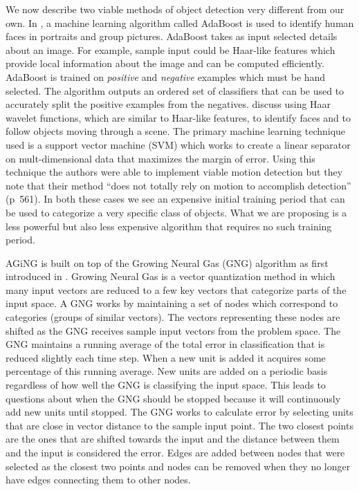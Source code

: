 \documentclass{article}
\renewcommand{\|}{\origbar} %
\begin{document}
We now describe two viable methods of object detection very different from our own. In , a machine learning algorithm called AdaBoost is used to identify human faces in portraits and group pictures. AdaBoost takes as input selected details about an image. For example, sample input could be Haar-like features which provide local information about the image and can be computed efficiently. AdaBoost is trained on {\em positive} and {\em negative} examples which must be hand selected. The algorithm outputs an ordered set of classifiers that can be used to accurately split the positive examples from the negatives.  discuss using Haar wavelet functions, which are similar to Haar-like features, to identify faces and to follow objects moving through a scene. The primary machine learning technique used is a support vector machine (SVM) which works to create a linear separator on mult-dimensional data that maximizes the margin of error. Using this technique the authors were able to implement viable motion detection but they note that their method ``does not totally rely on motion to accomplish detection'' (p~561). In both these cases we see an expensive initial training period that can be used to categorize a very specific class of objects. What we are proposing is a less powerful but also less expensive algorithm that requires no such training period.

AGiNG is built on top of the Growing Neural Gas (GNG) algorithm as first introduced in . Growing Neural Gas is a vector quantization method in which many input vectors are reduced to a few key vectors that categorize parts of the input space. A GNG works by maintaining a set of nodes which correspond to categories (groups of similar vectors). The vectors representing these nodes are shifted as the GNG receives sample input vectors from the problem space. The GNG maintains a running average of the total error in classification that is reduced slightly each time step. When a new unit is added it acquires some percentage of this running average. New units are added on a periodic basis regardless of how well the GNG is classifying the input space. This leads to questions about when the GNG should be stopped because it will continuously add new units until stopped. The GNG works to calculate error by selecting units that are close in vector distance to the sample input point. The two closest points are the ones that are shifted towards the input and the distance between them and the input is considered the error. Edges are added between nodes that were selected as the closest two points and nodes can be removed when they no longer have edges connecting them to other nodes.
\end{document}
